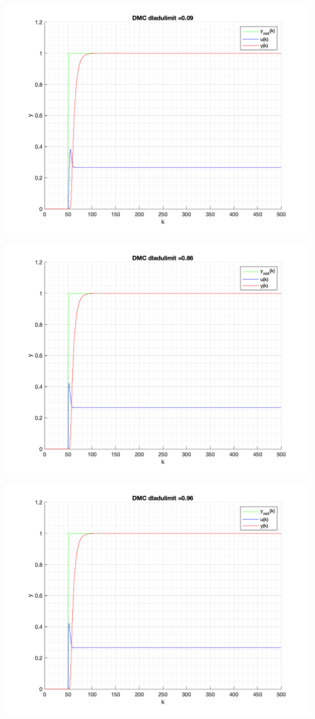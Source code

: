 \documentclass[a4paper, 11pt]{article}
\begin{document}
\begin{enumerate}
 \includegraphics[width=\linewidth]{./ModelsP6_dulimit/P4_DMC_dulimit_0_09_png.png} 
 
 \includegraphics[width=\linewidth]{./ModelsP6_dulimit/P4_DMC_dulimit_0_86_png.png} 
 
 \includegraphics[width=\linewidth]{./ModelsP6_dulimit/P4_DMC_dulimit_0_96_png.png} 
 

\end{enumerate}
\end{document}
